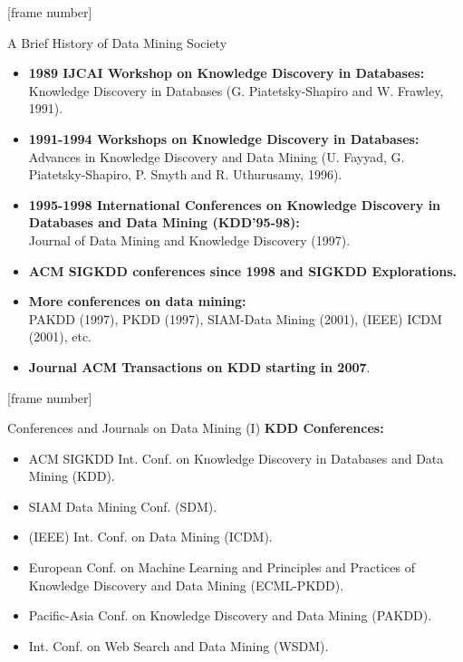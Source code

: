 \documentclass[aspectratio=169,t]{beamer}
\begin{document}
 {
    [frame number]
    \begin{frame}{A Brief History of Data Mining Society}
        \begin{itemize}
            \item \textbf{1989 IJCAI Workshop on Knowledge Discovery in Databases:}\\
                  Knowledge Discovery in Databases (G. Piatetsky-Shapiro and W. Frawley, 1991).
            \item \textbf{1991-1994 Workshops on Knowledge Discovery in Databases:}\\
                  Advances in Knowledge Discovery and Data Mining (U. Fayyad, G. Piatetsky-Shapiro, P. Smyth and R. Uthurusamy, 1996).
            \item \textbf{1995-1998 International Conferences on Knowledge Discovery in Databases and Data Mining (KDD’95-98):}\\
                  Journal of Data Mining and Knowledge Discovery (1997).
            \item \textbf{ACM SIGKDD conferences since 1998 and SIGKDD Explorations.}\\
            \item \textbf{More conferences on data mining:}\\
                  PAKDD (1997), PKDD (1997), SIAM-Data Mining (2001), (IEEE) ICDM (2001), etc.
            \item \textbf{Journal ACM Transactions on KDD starting in 2007}.
        \end{itemize}
    \end{frame}
  }

  {
    [frame number]
    \begin{frame}{Conferences and Journals on Data Mining (I)}
    \textbf{KDD Conferences:}
        \begin{itemize}
            \item ACM SIGKDD Int. Conf. on Knowledge Discovery in Databases and Data Mining (KDD).
            \item SIAM Data Mining Conf. (SDM).
            \item (IEEE) Int. Conf. on Data Mining (ICDM).
            \item European Conf. on Machine Learning and Principles and Practices of Knowledge Discovery and Data Mining (ECML-PKDD).
            \item Pacific-Asia Conf. on Knowledge Discovery and Data Mining (PAKDD).
            \item Int. Conf. on Web Search and Data Mining (WSDM).
        \end{itemize}
    \end{frame}
  }
\end{document}
